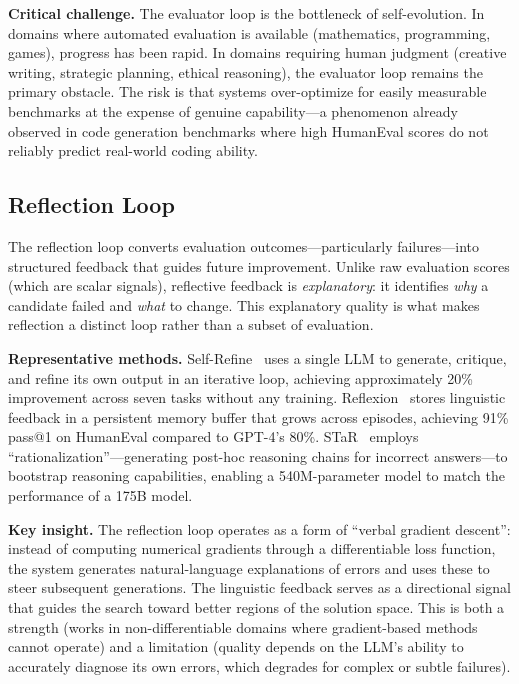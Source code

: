 \documentclass[11pt,a4paper]{article}
\begin{document}
\textbf{Critical challenge.} The evaluator loop is the bottleneck of self-evolution. In domains where automated evaluation is available (mathematics, programming, games), progress has been rapid. In domains requiring human judgment (creative writing, strategic planning, ethical reasoning), the evaluator loop remains the primary obstacle. The risk is that systems over-optimize for easily measurable benchmarks at the expense of genuine capability---a phenomenon already observed in code generation benchmarks where high HumanEval scores do not reliably predict real-world coding ability.

\subsection{Reflection Loop}

The reflection loop converts evaluation outcomes---particularly failures---into structured feedback that guides future improvement. Unlike raw evaluation scores (which are scalar signals), reflective feedback is \emph{explanatory}: it identifies \emph{why} a candidate failed and \emph{what} to change. This explanatory quality is what makes reflection a distinct loop rather than a subset of evaluation.

\textbf{Representative methods.} Self-Refine~\citep{madaan2023selfrefine} uses a single LLM to generate, critique, and refine its own output in an iterative loop, achieving approximately 20\% improvement across seven tasks without any training. Reflexion~\citep{shinn2023reflexion} stores linguistic feedback in a persistent memory buffer that grows across episodes, achieving 91\% pass@1 on HumanEval compared to GPT-4's 80\%. STaR~\citep{zelikman2022star} employs ``rationalization''---generating post-hoc reasoning chains for incorrect answers---to bootstrap reasoning capabilities, enabling a 540M-parameter model to match the performance of a 175B model.

\textbf{Key insight.} The reflection loop operates as a form of ``verbal gradient descent'': instead of computing numerical gradients through a differentiable loss function, the system generates natural-language explanations of errors and uses these to steer subsequent generations. The linguistic feedback serves as a directional signal that guides the search toward better regions of the solution space. This is both a strength (works in non-differentiable domains where gradient-based methods cannot operate) and a limitation (quality depends on the LLM's ability to accurately diagnose its own errors, which degrades for complex or subtle failures).
\end{document}
